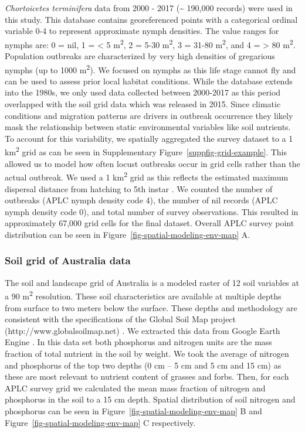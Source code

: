 \documentclass[
]{article}
\begin{document}
\emph{Chortoicetes terminifera} data from 2000 - 2017 (\textasciitilde{}
190,000 records) were used in this study. This database contains
georeferenced points with a categorical ordinal variable 0-4 to
represent approximate nymph densities. The value ranges for nymphs are:
0 = nil, 1 = \textless{} 5 m\textsuperscript{2}, 2 = 5-30
m\textsuperscript{2}, 3 = 31-80 m\textsuperscript{2}, and 4 =
\textgreater{} 80 m\textsuperscript{2}. Population outbreaks are
characterized by very high densities of gregarious nymphs (up to 1000
m\textsuperscript{2}). We focused on nymphs as this life stage cannot
fly and can be used to assess prior local habitat conditions. While the
database extends into the 1980s, we only used data collected between
2000-2017 as this period overlapped with the soil grid data which was
released in 2015. Since climatic conditions and migration patterns are
drivers in outbreak occurrence
\citep{lawton_seeing_2022, veran_modeling_2015} they likely mask the
relationship between static environmental variables like soil nutrients.
To account for this variability, we spatially aggregated the survey
dataset to a 1 km\textsuperscript{2} grid as can be seen in
Supplementary Figure~\ref{suppfig-grid-example}. This allowed us to
model how often locust outbreaks occur in grid cells rather than the
actual outbreak. We used a 1 km\textsuperscript{2} grid as this reflects
the estimated maximum dispersal distance from hatching to 5th instar
\citep{hunter_aerial_2008}. We counted the number of outbreaks (APLC
nymph density code 4), the number of nil records (APLC nymph density
code 0), and total number of survey observations. This resulted in
approximately 67,000 grid cells for the final dataset. Overall APLC
survey point distribution can be seen in
Figure~\ref{fig-spatial-modeling-env-map} A.

\subsubsection{Soil grid of Australia
data}\label{soil-grid-of-australia-data}

The soil and landscape grid of Australia is a modeled raster of 12 soil
variables at a 90 m\textsuperscript{2} resolution. These soil
characteristics are available at multiple depths from surface to two
meters below the surface. These depths and methodology are consistent
with the specifications of the Global Soil Map project
(http://www.globalsoilmap.net) \citep{grundy_soil_2015}. We extracted
this data from Google Earth Engine \citep{gorelick_google_2017}. In this
data set both phosphorus and nitrogen units are the mass fraction of
total nutrient in the soil by weight. We took the average of nitrogen
and phosphorus of the top two depths (0 cm -- 5 cm and 5 cm and 15 cm)
as these are most relevant to nutrient content of grasses and forbs.
Then, for each APLC survey grid we calculated the mean mass fraction of
nitrogen and phosphorus in the soil to a 15 cm depth. Spatial
distribution of soil nitrogen and phosphorus can be seen in
Figure~\ref{fig-spatial-modeling-env-map} B and
Figure~\ref{fig-spatial-modeling-env-map} C respectively.
\end{document}
